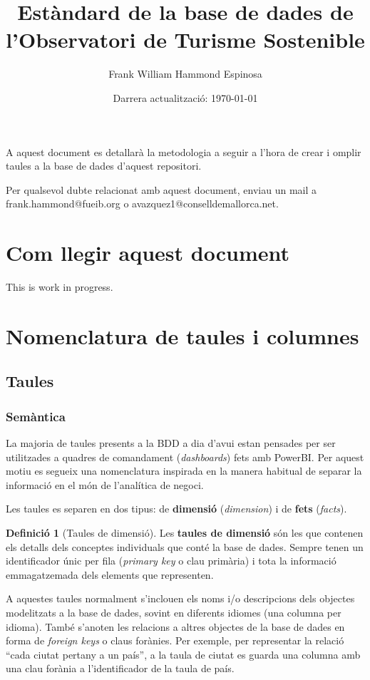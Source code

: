 \documentclass{article}
\title{Estàndard de la base de dades de \\l'Observatori de Turisme Sostenible}
\author{Frank William Hammond Espinosa}
\date{Darrera actualització: \today}
\theoremstyle{definition}
\newtheorem{definition}{Definició}
\begin{document}
\maketitle
\tableofcontents

A aquest document es detallarà la metodologia a seguir a l'hora de crear i omplir taules a la base de dades d'aquest repositori.

Per qualsevol dubte relacionat amb aquest document, enviau un mail a frank.hammond@fueib.org o avazquez1@conselldemallorca.net.

\section{Com llegir aquest document}\label{section:howtoread}
This is work in progress.

\section{Nomenclatura de taules i columnes}\label{section:nomenclature}
\subsection{Taules}\label{section:nomenclature:tables}
\subsubsection{Semàntica}\label{section:nomenclature:tables:semantics}
La majoria de taules presents a la BDD a dia d'avui estan pensades per ser utilitzades a quadres de comandament (\emph{dashboards}) fets amb PowerBI. Per aquest motiu es segueix una nomenclatura inspirada en la manera habitual de separar la informació en el món de l'analítica de negoci.

Les taules es separen en dos tipus: de \textbf{dimensió} (\emph{dimension}) i de \textbf{fets} (\emph{facts}).

\begin{definition}[Taules de dimensió]\label{def:tables:dimension}
  Les \textbf{taules de dimensió} són les que contenen els detalls dels conceptes individuals que conté la base de dades. Sempre tenen un identificador únic per fila (\emph{primary key} o clau primària) i tota la informació emmagatzemada dels elements que representen.
\end{definition}

A aquestes taules normalment s'inclouen els noms i/o descripcions dels objectes modelitzats a la base de dades, sovint en diferents idiomes (una columna per idioma). També s'anoten les relacions a altres objectes de la base de dades en forma de \emph{foreign keys} o claus forànies. Per exemple, per representar la relació ``cada ciutat pertany a un país'', a la taula de ciutat es guarda una columna amb una clau forània a l'identificador de la taula de país.
\end{document}
